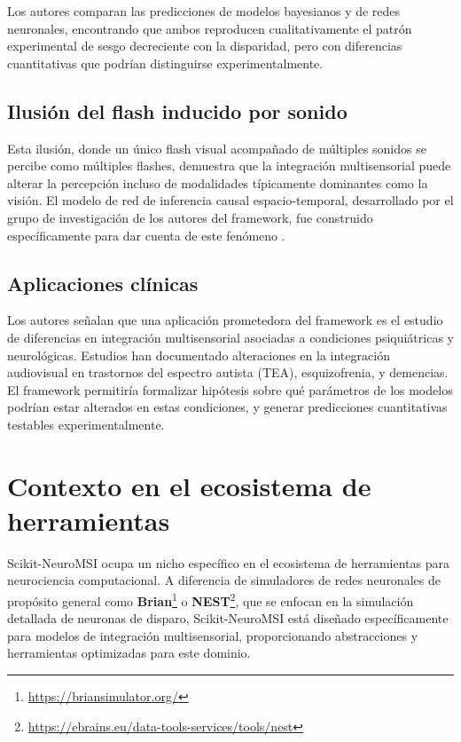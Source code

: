 Los autores comparan las predicciones de modelos bayesianos y de redes neuronales, encontrando que ambos reproducen cualitativamente el patrón experimental de sesgo decreciente con la disparidad, pero con diferencias cuantitativas que podrían distinguirse experimentalmente.

\subsection{Ilusión del flash inducido por sonido}
\label{subsec:snmsi_flash}

Esta ilusión, donde un único flash visual acompañado de múltiples sonidos se percibe como múltiples flashes, demuestra que la integración multisensorial puede alterar la percepción incluso de modalidades típicamente dominantes como la visión. El modelo de red de inferencia causal espacio-temporal, desarrollado por el grupo de investigación de los autores del framework, fue construido específicamente para dar cuenta de este fenómeno \citep{paredes2025scikit}.

\subsection{Aplicaciones clínicas}
\label{subsec:snmsi_clinicas}

Los autores señalan que una aplicación prometedora del framework es el estudio de diferencias en integración multisensorial asociadas a condiciones psiquiátricas y neurológicas. Estudios han documentado alteraciones en la integración audiovisual en trastornos del espectro autista (TEA), esquizofrenia, y demencias. El framework permitiría formalizar hipótesis sobre qué parámetros de los modelos podrían estar alterados en estas condiciones, y generar predicciones cuantitativas testables experimentalmente.


\section{Contexto en el ecosistema de herramientas}
\label{sec:snmsi_contexto}

Scikit-NeuroMSI ocupa un nicho específico en el ecosistema de herramientas para neurociencia computacional. A diferencia de simuladores de redes neuronales de propósito general como \textbf{Brian}\footnote{\url{https://briansimulator.org/}} o \textbf{NEST}\footnote{\url{https://ebrains.eu/data-tools-services/tools/nest}}, que se enfocan en la simulación detallada de neuronas de disparo, Scikit-NeuroMSI está diseñado específicamente para modelos de integración multisensorial, proporcionando abstracciones y herramientas optimizadas para este dominio.

